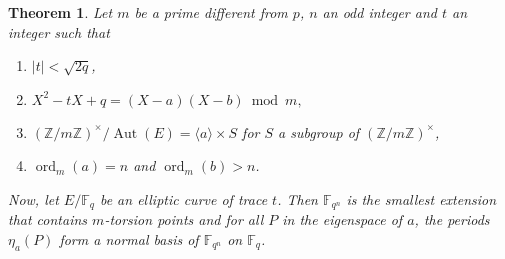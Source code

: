 \documentclass[12pt]{article}
\theoremstyle{plain}
\newtheorem{theorem}{Theorem}
\theoremstyle{definition}
\DeclareMathOperator{\order}{ord} %
\DeclareMathOperator{\Aut}{Aut}
\def\Z{\ensuremath{\mathbb{Z}}}
\def\F{\ensuremath{\mathbb{F}}}
\begin{document}
\begin{theorem}
\label{theorem:ellperiods}
Let $m$ be a prime different from $p$, $n$ an odd integer and $t$ an integer 
such that 

\begin{enumerate}
    \item $\mid t\mid < \sqrt{2q}$,
    \item $X^2 - tX + q = (X - a)(X - b)\bmod m,$
    \item $(\Z/m\Z)^{\times}/\Aut(E) = \langle{a}\rangle \times S$ for $S$ a subgroup of
$(\Z/m\Z)^{\times}$,
    \item $\order_m(a) = n$ and $\order_m(b) > n$.
\end{enumerate}
Now, let $E/\F_q$ be an elliptic curve of trace $t$. Then $\F_{q^n}$ is the
smallest extension that contains $m$-torsion points and for all $P$ in the
eigenspace of $a$, the periods $\eta_a(P)$ form a normal basis of $\F_{q^n}$ on
$\F_q$.

\end{theorem}
\end{document}
